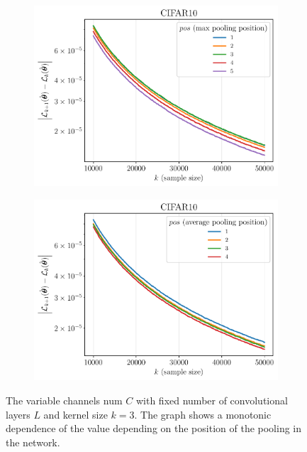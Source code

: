 \documentclass[conference]{IEEEtran}
\begin{document}
\begin{figure}[ht]
  \begin{subfigure}[b]{0.5\linewidth}
    \centering
    \includegraphics[width=\linewidth]{isp/figs/cifar10_change_maxpool_pos.pdf} 
  \end{subfigure}%
  \begin{subfigure}[b]{0.5\linewidth}
    \centering
    \includegraphics[width=\linewidth]{isp/figs/cifar10_change_avgpool_pos.pdf} 
  \end{subfigure} 
  \caption{The variable channels num $C$ with fixed number of convolutional layers $L$ and kernel size $k=3$. The graph shows a monotonic dependence of the value depending on the position of the pooling in the network.}
   \label{fig:pool_pos}
\end{figure}
\end{document}
